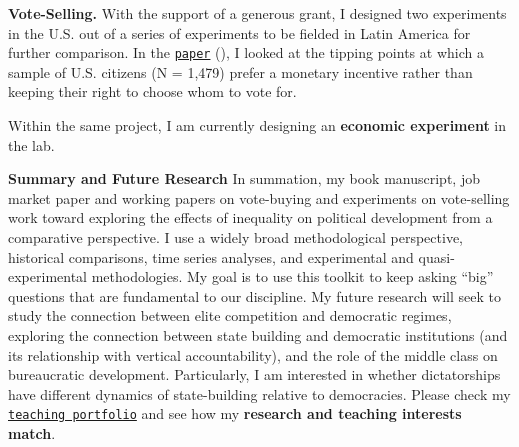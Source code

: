 \documentclass[10pt,stdletter,dateno,sigleft]{newlfm} %
\begin{document}
\begin{newlfm}
{\bf Vote-Selling.} With the support of a generous grant, I designed two experiments in the U.S. out of a series of experiments to be fielded in Latin America for further comparison. In the \href{https://github.com/hbahamonde/Vote_Selling/raw/master/Bahamonde_VoteSellingUS.pdf}{\texttt{paper}} (\emph{\unskip}), I looked at the tipping points at which a sample of U.S. citizens (N = 1,479) prefer a monetary incentive rather than keeping their right to choose whom to vote for. \unskip

Within the same project, I am currently designing an {\bf economic experiment} in the lab. \unskip




{\bf Summary and Future Research} In summation, my book manuscript, job market paper and working papers on vote-buying and experiments on vote-selling work toward exploring the effects of inequality on political development from a comparative perspective. I use a widely broad methodological perspective, historical comparisons, time series analyses, and experimental and quasi-experimental methodologies. My goal is to use this toolkit to keep asking ``big'' questions that are fundamental to our discipline. My future research will seek to study the connection between elite competition and democratic regimes, exploring the connection between state building and democratic institutions (and its relationship with vertical accountability), and the role of the middle class on bureaucratic development. Particularly, I am interested in whether dictatorships have different dynamics of state-building relative to democracies. Please check my \href{http://www.hectorbahamonde.com/teaching/}{\texttt{teaching portfolio}} and see how my {\bf research and teaching interests match}.



\end{newlfm}
\end{document}
